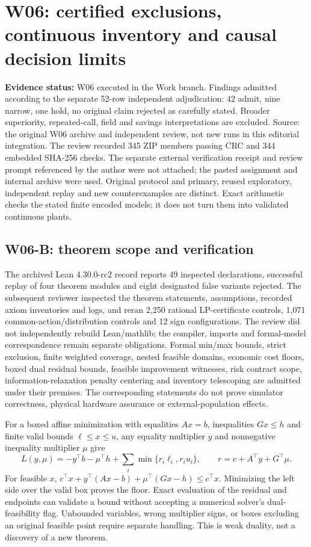 \documentclass[11pt,letterpaper]{article}
\newcommand{\status}[1]{\textbf{Evidence status:} #1}
\begin{document}
\section{W06: certified exclusions, continuous inventory and causal decision limits}
\label{sec:w06results}
\status{W06 executed in the Work branch. Findings admitted according to the separate 52-row independent adjudication: 42 admit, nine narrow, one hold, no original claim rejected as carefully stated. Broader superiority, repeated-call, field and savings interpretations are excluded. Source: the original W06 archive and independent review, not new runs in this editorial integration.\cite{w06packet,w06review}}
The review recorded 345 ZIP members passing CRC and 344 embedded SHA-256 checks. The separate external verification receipt and review prompt referenced by the author were not attached; the pasted assignment and internal archive were used. Original protocol and primary, reused exploratory, independent replay and new counterexamples are distinct. Exact arithmetic checks the stated finite encoded models; it does not turn them into validated continuous plants.

\subsection{W06-B: theorem scope and verification}
The archived Lean 4.30.0-rc2 record reports 49 inspected declarations, successful replay of four theorem modules and eight designated false variants rejected. The subsequent reviewer inspected the theorem statements, assumptions, recorded axiom inventories and logs, and reran 2,250 rational LP-certificate controls, 1,071 common-action/distribution controls and 12 sign configurations. The review did not independently rebuild Lean/mathlib; the compiler, imports and formal-model correspondence remain separate obligations. Formal min/max bounds, strict exclusion, finite weighted coverage, nested feasible domains, economic cost floors, boxed dual residual bounds, feasible improvement witnesses, risk contract scope, information-relaxation penalty centering and inventory telescoping are admitted under their premises. The corresponding statements do not prove simulator correctness, physical hardware assurance or external-population effects.

For a boxed affine minimization with equalities $Ax=b$, inequalities $Gx\le h$ and finite valid bounds $\ell\le x\le u$, any equality multiplier $y$ and nonnegative inequality multiplier $\mu$ give
\[
 L(y,\mu)=-y^\top b-\mu^\top h+
 \sum_i\min\{r_i\ell_i,r_i u_i\},\qquad
 r=c+A^\top y+G^\top\mu.
\]
For feasible $x$, $c^\top x+y^\top(Ax-b)+\mu^\top(Gx-h)\le c^\top x$. Minimizing the left side over the valid box proves the floor. Exact evaluation of the residual and endpoints can validate a bound without accepting a numerical solver's dual-feasibility flag. Unbounded variables, wrong multiplier signs, or boxes excluding an original feasible point require separate handling. This is weak duality, not a discovery of a new theorem.
\end{document}
